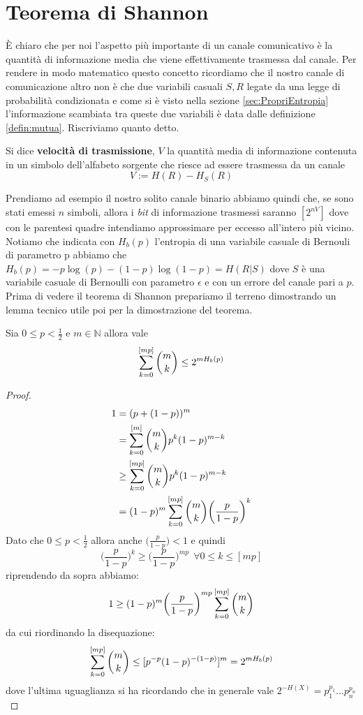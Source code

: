 \section{Teorema di Shannon}
È chiaro che per noi l'aspetto più importante di un canale comunicativo è la quantità di informazione media che viene effettivamente trasmessa dal canale. Per rendere in modo matematico questo concetto ricordiamo che il nostro canale di comunicazione altro non è che due variabili casuali $S,R$ legate da una legge di probabilità condizionata e come si è visto nella sezione \ref{sec:PropriEntropia} l'informazione scambiata tra queste due variabili è data dalle definizione \ref{defin:mutua}. Riscriviamo quanto detto.
\begin{defi}
Si dice \textbf{velocità di trasmissione}, $V$ la quantità media di informazione contenuta in un simbolo dell'alfabeto sorgente che riesce ad essere trasmessa da un canale
$$V:=H(R)-H_S(R)$$
\end{defi}
Prendiamo ad esempio il nostro solito canale binario abbiamo quindi che, se sono stati emessi $n$ simboli, allora i \textit{bit} di informazione trasmessi saranno $[2^{nV}]$ dove con le parentesi quadre intendiamo approssimare per eccesso all'intero più vicino.\\
Notiamo che indicata con $H_b(p)$ l'entropia di una variabile casuale di Bernouli di parametro p abbiamo che $H_b(p)=-p \log(p)- (1-p) \log(1-p) =H(R|S)$ dove $S$ è una variabile casuale di Bernoulli con parametro $\epsilon$ e con un errore del canale pari a $p$.\\
Prima di vedere il teorema di Shannon prepariamo il terreno dimostrando un lemma tecnico utile poi per la dimostrazione del teorema.
\begin{lem}
Sia $0 \leq p < \frac{1}{2}$ e $m\in \mathbb{N}$ allora vale
\begin{equation} \label{eq:7.6}
\sum_{k=0}^{[mp]} {m \choose k} \leq 2^{mH_b(p)}
\end{equation}
\end{lem}
\begin{proof}

 \[
\begin{split}
1&=(p+(1-p))^m \\
& = \sum_{k=0}^{[m]}  {m \choose k} p^k (1-p)^{m-k}\\
& \geq   \sum_{k=0}^{[mp]} {m \choose k} p^k (1-p)^{m-k} \\
&=(1-p)^m \sum_{k=0}^{[mp]} {m \choose k} \bigg( \frac{p}{1-p} \bigg)^k
\end{split}
\]
Dato che $0 \leq p < \frac{1}{2}$ allora anche $\bigg( \frac{p}{1-p} \bigg)<1$ e quindi
$$\bigg( \frac{p}{1-p} \bigg)^k \geq \bigg( \frac{p}{1-p} \bigg)^{mp} \ \ \forall 0\leq k \leq [mp]$$
riprendendo da sopra abbiamo:
$$1 \geq (1-p)^m  \bigg( \frac{p}{1-p} \bigg)^{mp} \sum_{k=0}^{[mp]} {m \choose k}$$
da cui riordinando la disequazione:
$$\sum_{k=0}^{[mp]} {m \choose k} \leq [p^{-p}(1-p)^{-(1-p)}]^m= 2^{mH_b(p)}$$
dove l'ultima uguaglianza si ha ricordando che in generale vale $2^{-H(X)}=p_1^{p_1}...p_n^{p_n}$
\end{proof}
